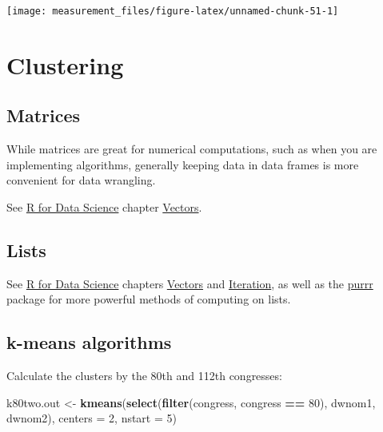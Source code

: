 \documentclass[]{book}
\newenvironment{Shaded}{\begin{snugshade}}{\end{snugshade}}
\newcommand{\KeywordTok}[1]{\textcolor[rgb]{0.13,0.29,0.53}{\textbf{#1}}}
\newcommand{\DataTypeTok}[1]{\textcolor[rgb]{0.13,0.29,0.53}{#1}}
\newcommand{\DecValTok}[1]{\textcolor[rgb]{0.00,0.00,0.81}{#1}}
\newcommand{\StringTok}[1]{\textcolor[rgb]{0.31,0.60,0.02}{#1}}
\newcommand{\OperatorTok}[1]{\textcolor[rgb]{0.81,0.36,0.00}{\textbf{#1}}}
\newcommand{\NormalTok}[1]{#1}
\theoremstyle{definition}
\theoremstyle{definition}
\theoremstyle{definition}
\theoremstyle{remark}
\begin{document}
\begin{center}\texttt{[image: measurement\_files/figure-latex/unnamed-chunk-51-1]} \end{center}

\section{Clustering}\label{clustering}

\subsection{Matrices}\label{matrices}

While matrices are great for numerical computations, such as when you
are implementing algorithms, generally keeping data in data frames is
more convenient for data wrangling.

See \href{http://r4ds.had.co.nz/}{R for Data Science} chapter
\href{http://r4ds.had.co.nz/vectors.html}{Vectors}.

\subsection{Lists}\label{lists}

See \href{http://r4ds.had.co.nz/}{R for Data Science} chapters
\href{http://r4ds.had.co.nz/vectors.html}{Vectors} and
\href{http://r4ds.had.co.nz/iteration.html}{Iteration}, as well as the
\href{https://cran.r-project.org/package=purrr}{purrr} package for more
powerful methods of computing on lists.

\subsection{k-means algorithms}\label{k-means-algorithms}

Calculate the clusters by the 80th and 112th congresses:

\begin{Shaded}
\begin{Highlighting}[]
\NormalTok{k80two.out <-}
\StringTok{  }\KeywordTok{kmeans}\NormalTok{(}\KeywordTok{select}\NormalTok{(}\KeywordTok{filter}\NormalTok{(congress, congress }\OperatorTok{==}\StringTok{ }\DecValTok{80}\NormalTok{),}
\NormalTok{                       dwnom1, dwnom2),}
              \DataTypeTok{centers =} \DecValTok{2}\NormalTok{, }\DataTypeTok{nstart =} \DecValTok{5}\NormalTok{)}
\end{Highlighting}
\end{Shaded}
\end{document}
